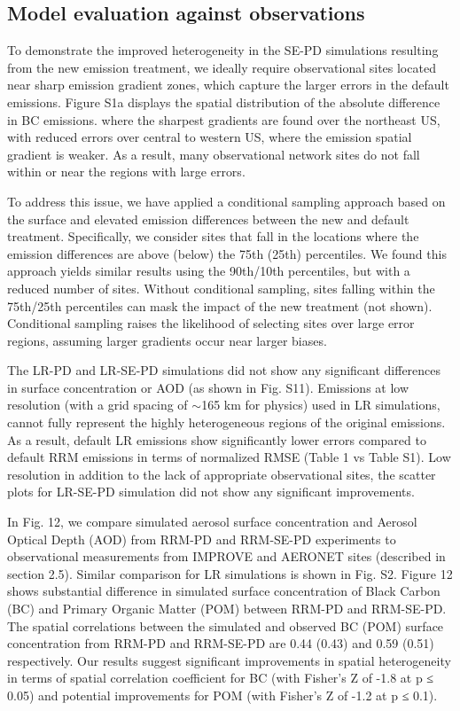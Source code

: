 \subsection{Model evaluation against observations}
To demonstrate the improved heterogeneity in the SE-PD simulations resulting from the new emission treatment, we ideally require observational sites located near sharp emission gradient zones, which capture the larger errors in the default emissions. Figure S1a displays the spatial distribution of the absolute difference in BC emissions. where the sharpest gradients are found over the northeast US, with reduced errors over central to western US, where the emission spatial gradient is weaker. As a result, many observational network sites do not fall within or near the regions with large errors.

To address this issue, we have applied a conditional sampling approach based on the surface and elevated emission differences between the new and default treatment. Specifically, we consider sites that fall in the locations where the emission differences are above (below) the 75th (25th) percentiles. We found this approach yields similar results using the 90th/10th percentiles, but with a reduced number of sites. Without conditional sampling, sites falling within the 75th/25th percentiles can mask the impact of the new treatment (not shown). Conditional sampling raises the likelihood of selecting sites over large error regions, assuming larger gradients occur near larger biases.
 
The LR-PD and LR-SE-PD simulations did not show any significant differences in surface concentration or AOD (as shown in Fig. S11). Emissions at low resolution (with a grid spacing of $\sim$165 km for physics) used in LR simulations, cannot fully represent the highly heterogeneous regions of the original emissions. As a result, default LR emissions show significantly lower errors compared to default RRM emissions in terms of normalized RMSE (Table 1 vs Table S1). Low resolution in addition to the lack of appropriate observational sites, the scatter plots for LR-SE-PD simulation did not show any significant improvements.
 
In Fig. 12, we compare simulated aerosol surface concentration and Aerosol Optical Depth (AOD) from RRM-PD and RRM-SE-PD experiments to observational measurements from IMPROVE and AERONET sites (described in section 2.5). Similar comparison for LR simulations is shown in Fig. S2. Figure 12 shows substantial difference in simulated surface concentration of Black Carbon (BC) and Primary Organic Matter (POM) between RRM-PD and RRM-SE-PD. The spatial correlations between the simulated and observed BC (POM) surface concentration from RRM-PD and RRM-SE-PD are 0.44 (0.43) and 0.59 (0.51) respectively. Our results suggest significant improvements in spatial heterogeneity in terms of spatial correlation coefficient for BC (with Fisher’s Z of -1.8 at p ≤ 0.05) and potential improvements for POM (with Fisher’s Z of -1.2 at p ≤ 0.1).

